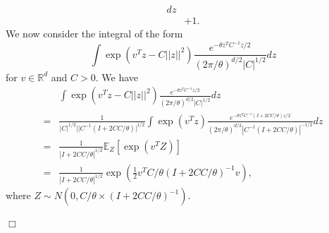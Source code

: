 \documentclass[12pt]{article}
\newenvironment {proof}{{\noindent\bf Proof }}{\hfill $\Box$ \medskip}
\newcommand{\covq}{C}     %
\begin{document}
\begin{proof}
\begin{align}
{    }
dz\\
&+1.
\end{align}
We now consider the integral of the form 
\begin{equation}
\int \exp(v^{T}z-C||z||^2) \frac{
        e^{-\theta z^{T}\covq^{-1}z  / 2}
    }{
        (2 \pi/ \theta)^{d/2} |\covq|^{1/2}
    }
dz   
\end{equation}
for $v \in \mathbb{R}^d$ and $C>0$. 
We have 
\begin{equation}
\begin{aligned}
&\int \exp(v^{T}z-C||z||^2) \frac{
        e^{-\theta z^{T}\covq^{-1}z  / 2}
    }{
        (2 \pi/ \theta)^{d/2} |\covq|^{1/2}
    }
dz\\
=&\frac{1}{|\covq|^{1/2}|  |\covq^{-1}(I+2C\covq/\theta )|^{1/2}  }\int \exp(v^{T}z) \frac{
        e^{-\theta z^{T}\covq^{-1}(I+2C\covq/\theta )z  / 2}
    }{
        (2 \pi/ \theta)^{d/2}|\covq^{-1}(I+2C\covq/\theta )|^{-1/2} 
    }
dz\\
=& \frac{1}{|I+2C\covq/\theta |^{1/2}} \mathbb{E}_{Z}[\exp (v^{T}Z)]\\
=&\frac{1}{|I+2C\covq/\theta |^{1/2}}
\exp 
\left(
\frac{1}{2}v^{T}\covq/\theta(I+2C\covq/\theta )^{-1}v
\right),
\end{aligned}
\end{equation}
where $Z \sim N(0, \covq/\theta \times (I+2C\covq/\theta )^{-1})$.


\end{proof}
\end{document}
